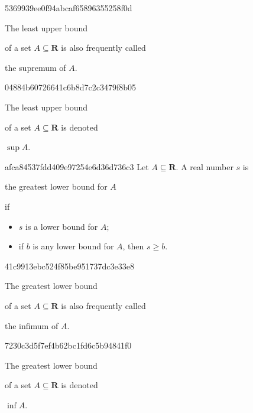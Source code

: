 \begin{note}{5369939ee0f94abcaf65896355258f0d}
    \begin{icloze}{2}The least upper bound\end{icloze} of a set \({ A \subseteq \mathbf{R} }\) is also frequently called \begin{icloze}{1}the supremum of \({ A }\).\end{icloze}
\end{note}

\begin{note}{04884b60726641c6b8d7c2c3479f8b05}
    \begin{icloze}{2}The least upper bound\end{icloze} of a set \({ A \subseteq \mathbf{R} }\) is denoted \begin{icloze}{1}\({ \sup A }\).\end{icloze}
\end{note}

\begin{note}{afca84537fdd409e97254e6d36d736c3}
    Let \({ A \subseteq \mathbf{R} }\). A real number \({ s }\) is \begin{icloze}{3}the greatest lower bound for \({ A }\)\end{icloze} if
    \begin{itemize}
        \item{} \begin{icloze}{2}\({ s }\) is a lower bound for \({ A }\);\end{icloze}
        \item{} \begin{icloze}{1}if \({ b }\) is any lower bound for \({ A }\), then \({ s \geq b }\).\end{icloze}
    \end{itemize}
\end{note}

\begin{note}{41c9913ebc524f85be951737dc3e33e8}
    \begin{icloze}{2}The greatest lower bound\end{icloze} of a set \({ A \subseteq \mathbf{R} }\) is also frequently called \begin{icloze}{1}the infimum of \({ A }\).\end{icloze}
\end{note}

\begin{note}{7230c3d5f7ef4b62bc1fd6c5b94841f0}
    \begin{icloze}{2}The greatest lower bound\end{icloze} of a set \({ A \subseteq \mathbf{R} }\) is denoted \begin{icloze}{1}\({ \inf A }\).\end{icloze}
\end{note}

